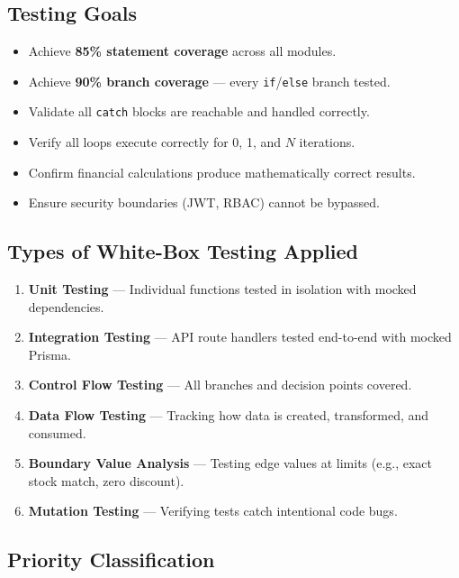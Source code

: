 \documentclass[12pt,a4paper]{report}
\begin{document}
\subsection{Testing Goals}

\begin{itemize}[leftmargin=1.5em]
  \item Achieve \textbf{85\% statement coverage} across all modules.
  \item Achieve \textbf{90\% branch coverage} --- every \texttt{if}/\texttt{else} branch tested.
  \item Validate all \texttt{catch} blocks are reachable and handled correctly.
  \item Verify all loops execute correctly for 0, 1, and $N$ iterations.
  \item Confirm financial calculations produce mathematically correct results.
  \item Ensure security boundaries (JWT, RBAC) cannot be bypassed.
\end{itemize}

\subsection{Types of White-Box Testing Applied}

\begin{enumerate}[leftmargin=1.5em]
  \item \textbf{Unit Testing} --- Individual functions tested in isolation with mocked dependencies.
  \item \textbf{Integration Testing} --- API route handlers tested end-to-end with mocked Prisma.
  \item \textbf{Control Flow Testing} --- All branches and decision points covered.
  \item \textbf{Data Flow Testing} --- Tracking how data is created, transformed, and consumed.
  \item \textbf{Boundary Value Analysis} --- Testing edge values at limits (e.g., exact stock match, zero discount).
  \item \textbf{Mutation Testing} --- Verifying tests catch intentional code bugs.
\end{enumerate}

\subsection{Priority Classification}
\end{document}
